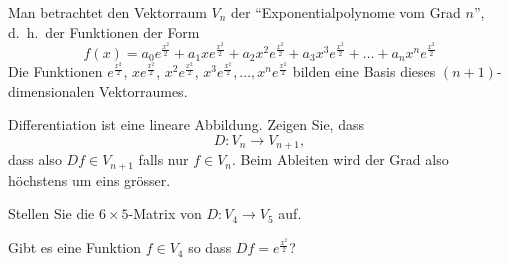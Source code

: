 Man betrachtet den Vektorraum $V_n$ der ``Exponentialpolynome vom Grad $n$'',
d.~h.~der Funktionen der Form
\[
f(x)=
a_0e^{\frac{x^2}2}
+a_1xe^{\frac{x^2}2}
+a_2x^2e^{\frac{x^2}2}
+a_3x^3e^{\frac{x^2}2}
+\dots
+a_nx^ne^{\frac{x^2}2}
\]
Die Funktionen
$e^{\frac{x^2}2}$,
$xe^{\frac{x^2}2}$,
$x^2e^{\frac{x^2}2}$,
$x^3e^{\frac{x^2}2},\dots,
x^ne^{\frac{x^2}2}$
bilden eine Basis dieses $(n+1)$-dimensionalen Vektorraumes.
\begin{teilaufgaben}
\item Differentiation
ist eine lineare Abbildung.
Zeigen Sie, dass
\[
D\colon V_n\to V_{n+1},
\]
dass also $Df\in V_{n+1}$ falls nur $f\in V_n$. Beim Ableiten wird der Grad
also höchstens um eins grösser.
\item Stellen Sie die $6\times 5$-Matrix von $D\colon V_4\to V_5$ auf.
\item Gibt es eine Funktion $f\in V_4$ so dass $Df=e^{\frac{x^2}2}$?
\end{teilaufgaben}

